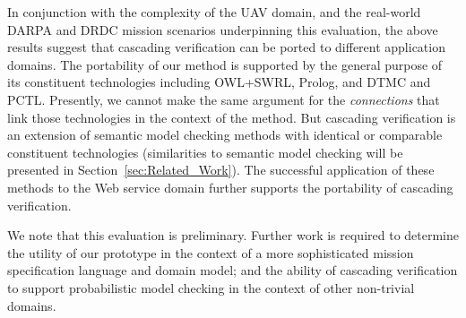 In conjunction with the complexity of the UAV domain, and the real-world DARPA and DRDC mission scenarios underpinning this evaluation, the above results suggest that cascading verification can be ported to different application domains. The portability of our method is supported by the general purpose of its constituent technologies including OWL+SWRL, Prolog, and DTMC and PCTL\@. Presently, we cannot make the same argument for the \emph{connections} that link those technologies in the context of the method. But cascading verification is an extension of semantic model checking methods with identical or comparable constituent technologies (similarities to semantic model checking will be presented in Section~\ref{sec:Related_Work}). The successful application of these methods to the Web service domain further supports the portability of cascading verification.

We note that this evaluation is preliminary. Further work is required to determine the utility of our prototype in the context of a more sophisticated mission specification language and domain model; and the ability of cascading verification to support probabilistic model checking in the context of other non-trivial domains.
